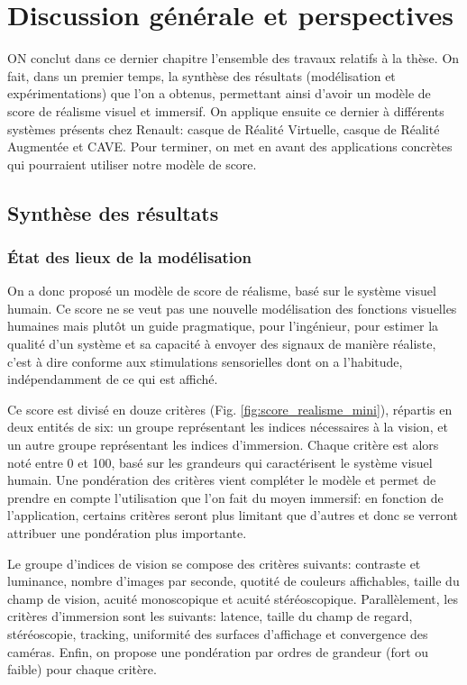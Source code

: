 \chapter*{Discussion générale et perspectives}

\lettrine[lines=3]{O}{N} conclut dans ce dernier chapitre l'ensemble des travaux relatifs à la thèse. On fait, dans un premier temps, la synthèse des résultats (modélisation et expérimentations) que l'on a obtenus, permettant ainsi d'avoir un modèle de score de réalisme visuel et immersif. On applique ensuite ce dernier à différents systèmes présents chez Renault: casque de Réalité Virtuelle, casque de Réalité Augmentée et CAVE. Pour terminer, on met en avant des applications concrètes qui pourraient utiliser notre modèle de score.

\section*{Synthèse des résultats}
	\subsection*{État des lieux de la modélisation}
	\par On a donc proposé un modèle de score de réalisme, basé sur le système visuel humain. Ce score ne se veut pas une nouvelle modélisation des fonctions visuelles humaines mais plutôt un guide pragmatique, pour l'ingénieur, pour estimer la qualité d'un système et sa capacité à envoyer des signaux de manière réaliste, c'est à dire conforme aux stimulations sensorielles dont on a l'habitude, indépendamment de ce qui est affiché.
	
	\par Ce score est divisé en douze critères (Fig. \ref{fig:score_realisme_mini}), répartis en deux entités de six: un groupe représentant les indices nécessaires à la vision, et un autre groupe représentant les indices d'immersion. Chaque critère est alors noté entre 0 et 100, basé sur les grandeurs qui caractérisent le système visuel humain. Une pondération des critères vient compléter le modèle et permet de prendre en compte l'utilisation que l'on fait du moyen immersif: en fonction de l'application, certains critères seront plus limitant que d'autres et donc se verront attribuer une pondération plus importante.
	
	\par Le groupe d'indices de vision se compose des critères suivants: contraste et luminance, nombre d'images par seconde, quotité de couleurs affichables, taille du champ de vision, acuité monoscopique et acuité stéréoscopique. Parallèlement, les critères d'immersion sont les suivants: latence, taille du champ de regard, stéréoscopie, tracking, uniformité des surfaces d'affichage et convergence des caméras. Enfin, on propose une pondération par ordres de grandeur (fort ou faible) pour chaque critère.
	
